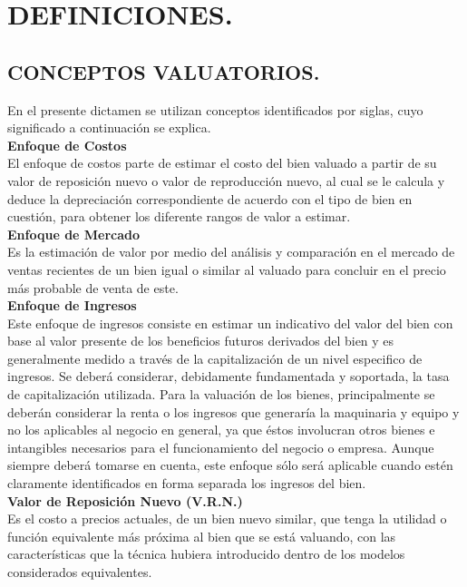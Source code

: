 \chapter{DEFINICIONES.} %

\section{CONCEPTOS VALUATORIOS.} %
En el presente dictamen se utilizan conceptos identificados por siglas, cuyo significado a continuación se explica. \\[6mm]
\textbf{Enfoque de Costos} \\ 
El enfoque de costos parte de estimar el costo del bien valuado a partir de su valor de reposición nuevo o valor de reproducción nuevo, al cual se le calcula y deduce la depreciación correspondiente de acuerdo con el tipo de bien en cuestión, para obtener los diferente rangos de valor a estimar. \\[6mm]
\textbf{Enfoque de Mercado} \\ 
Es la estimación de valor por medio del análisis y comparación en el mercado de ventas recientes de un bien igual o similar al valuado para concluir en el precio más probable de venta de este. \\[6mm]
\textbf{Enfoque de Ingresos} \\ 
Este enfoque de ingresos consiste en estimar un indicativo del valor del bien con base al valor presente de los beneficios futuros derivados del bien y es generalmente medido a través de la capitalización de un nivel especifico de ingresos. 
Se deberá considerar, debidamente fundamentada y soportada, la tasa de capitalización utilizada.
Para la valuación de los bienes, principalmente se deberán considerar la renta o los ingresos que generaría la maquinaria y equipo y no los aplicables al negocio en general, ya que éstos involucran otros bienes e intangibles necesarios para el funcionamiento del negocio o empresa. 
Aunque siempre deberá tomarse en cuenta, este enfoque sólo será aplicable cuando estén claramente identificados en forma separada los ingresos del bien. \\[6mm]
\textbf{Valor de Reposición Nuevo (V.R.N.)} \\ 
Es el costo a precios actuales, de un bien nuevo similar, que tenga la utilidad o función equivalente más próxima al bien que se está valuando, con las características que la  técnica  hubiera  introducido dentro de los modelos considerados equivalentes. \\[6mm]
